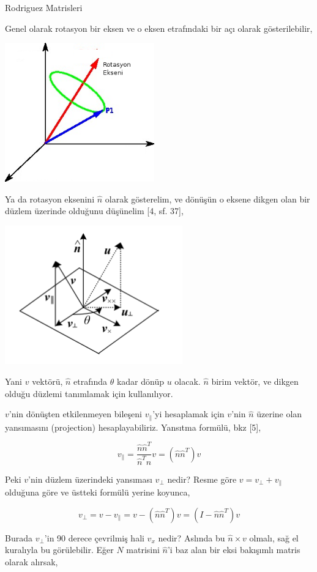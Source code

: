 \documentclass[12pt,fleqn]{article}\usepackage{../../common}
\begin{document}
Rodriguez Matrisleri

Genel olarak rotasyon bir eksen ve o eksen etrafındaki bir açı olarak
gösterilebilir,

\includegraphics[height=6cm]{phy_072_rot_08.png}

Ya da rotasyon eksenini $\hat{n}$ olarak gösterelim, ve dönüşün o eksene
dikgen olan bir düzlem üzerinde olduğunu düşünelim [4, sf. 37],

\includegraphics[height=6cm]{phy_072_rot_07.png}

Yani $v$ vektörü, $\hat{n}$ etrafında $\theta$ kadar dönüp $u$ olacak. $\hat{n}$ birim vektör, 
ve dikgen olduğu düzlemi tanımlamak için kullanılıyor.

$v$'nin dönüşten etkilenmeyen bileşeni $v_\parallel$'yi hesaplamak için
$v$'nin $\hat{n}$ üzerine olan yansımasını (projection) hesaplayabiliriz. 
Yansıtma formülü, bkz [5],

$$ v_\parallel =  \frac{\hat{n}\hat{n}^T}{\hat{n}^T\hat{n}} v 
= (\hat{n}\hat{n}^T) v
$$

Peki $v$'nin düzlem üzerindeki yansıması $v_\perp$ nedir? Resme göre $v =
v_\perp + v_\parallel$ olduğuna göre ve üstteki formülü yerine koyunca,

$$ v_\perp = v - v_\parallel 
= v - (\hat{n}\hat{n}^T) v 
= (I - \hat{n}\hat{n}^T) v
$$

Burada $v_\perp$'in 90 derece çevrilmiş hali $v_x$ nedir? Aslında bu
$\hat{n} \times v$ olmalı, sağ el kuralıyla bu görülebilir. Eğer $N$
matrisini $\hat{n}$'i baz alan bir eksi bakışımlı matris olarak alırsak, 
\end{document}
